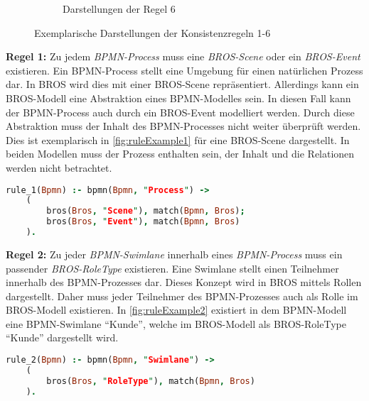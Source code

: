 \begin{figure}
\begin{subfigure}{0.4\textwidth}
%
        \caption{Darstellungen der Regel 6}%
        \label{fig:ruleExample6}
    \end{subfigure}
    \caption{Exemplarische Darstellungen der Konsistenzregeln 1-6}%
    \label{fig:ruleExamples}
\end{figure}

\textbf{Regel 1:} 
Zu jedem \emph{BPMN-Process} muss eine \emph{BROS-Scene} oder ein \emph{BROS-Event} existieren.
Ein BPMN-Process stellt eine Umgebung für einen natürlichen Prozess dar.
In BROS wird dies mit einer BROS-Scene repräsentiert.
Allerdings kann ein BROS-Modell eine Abstraktion eines BPMN-Modelles sein.
In diesen Fall kann der BPMN-Process auch durch ein BROS-Event modelliert werden.
Durch diese Abstraktion muss der Inhalt des BPMN-Processes nicht weiter überprüft werden.
Dies ist exemplarisch in \cref{fig:ruleExample1} für eine BROS-Scene dargestellt.
In beiden Modellen muss der Prozess enthalten sein, der Inhalt und die Relationen werden nicht betrachtet.

\begin{lstlisting}[language=Prolog, caption=Formalisierung der Regel 1, label=lst:rule_1]
rule_1(Bpmn) :- bpmn(Bpmn, "Process") ->
    (
        bros(Bros, "Scene"), match(Bpmn, Bros);
        bros(Bros, "Event"), match(Bpmn, Bros)
    ).
\end{lstlisting}

\textbf{Regel 2:}
Zu jeder \emph{BPMN-Swimlane} innerhalb eines \emph{BPMN-Process} muss ein passender \emph{BROS-RoleType} existieren.
Eine Swimlane stellt einen Teilnehmer innerhalb des BPMN-Prozesses dar. 
Dieses Konzept wird in BROS mittels Rollen dargestellt.
Daher muss jeder Teilnehmer des BPMN-Prozesses auch als Rolle im BROS-Modell existieren.
In \cref{fig:ruleExample2} existiert in dem BPMN-Modell eine BPMN-Swimlane ``Kunde'', welche im BROS-Modell als BROS-RoleType ``Kunde'' dargestellt wird.

\begin{lstlisting}[language=Prolog, caption=Formalisierung der Regel 2, label=lst:rule_2]
rule_2(Bpmn) :- bpmn(Bpmn, "Swimlane") ->
    (
        bros(Bros, "RoleType"), match(Bpmn, Bros)
    ).
\end{lstlisting}

